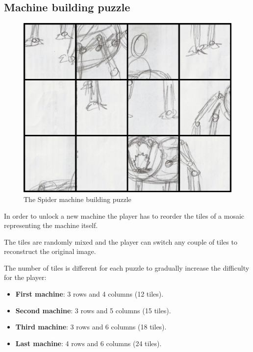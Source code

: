 \subsection{Machine building puzzle}
\begin{figure}[H]
  \centering
  \includegraphics[width=\textwidth]{Images/Puzzles/machine}
  \caption{The Spider machine building puzzle}
\end{figure}

In order to unlock a new machine the player has to reorder the tiles of a mosaic representing the machine itself.

The tiles are randomly mixed and the player can switch any couple of tiles to reconstruct the original image.

The number of tiles is different for each puzzle to gradually increase the difficulty for the player:
\begin{itemize}
	\item \textbf{First machine}: 3 rows and 4 columns (12 tiles).
	\item \textbf{Second machine}: 3 rows and 5 columns (15 tiles).
	\item \textbf{Third machine}: 3 rows and 6 columns (18 tiles).
	\item \textbf{Last machine}: 4 rows and 6 columns (24 tiles).
\end{itemize}

